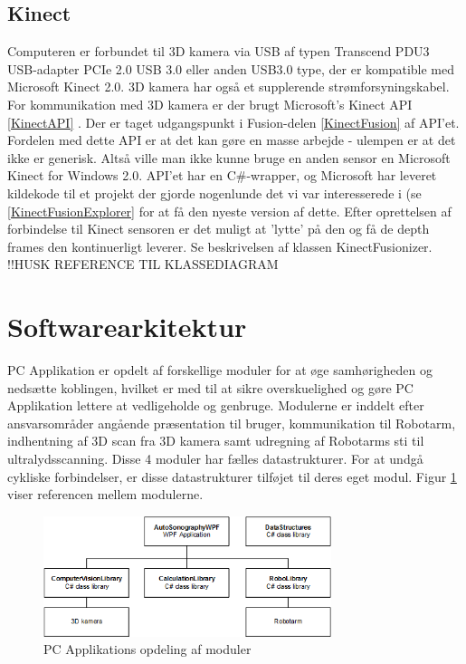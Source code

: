 \subsection{Kinect}
Computeren er forbundet til 3D kamera via USB af typen Transcend PDU3 USB-adapter PCIe 2.0 USB 3.0 eller anden USB3.0 type, der er kompatible med Microsoft Kinect 2.0. 3D kamera har også et supplerende strømforsyningskabel.
For kommunikation med 3D kamera er der brugt Microsoft's Kinect API \ref{KinectAPI} .
Der er taget udgangspunkt i Fusion-delen \ref{KinectFusion} af API'et. Fordelen med dette API er at det kan gøre en masse arbejde - ulempen er at det ikke er generisk. Altså ville man ikke kunne bruge en anden sensor en Microsoft Kinect for Windows 2.0. API'et har en C\#-wrapper, og Microsoft har leveret kildekode til et projekt der gjorde nogenlunde det vi var interesserede i (se \ref{KinectFusionExplorer} for at få den nyeste version af dette.
Efter oprettelsen af forbindelse til Kinect sensoren er det muligt at 'lytte' på den og få de depth frames den kontinuerligt leverer. Se beskrivelsen af klassen KinectFusionizer. !!HUSK REFERENCE TIL KLASSEDIAGRAM
 
\newpage

\section{Softwarearkitektur}
PC Applikation er opdelt af forskellige moduler for at øge samhørigheden og nedsætte koblingen, hvilket er med til at sikre overskuelighed og gøre PC Applikation lettere at vedligeholde og genbruge. Modulerne er inddelt efter ansvarsområder angående præsentation til bruger, kommunikation til Robotarm, indhentning af 3D scan fra 3D kamera samt udregning af Robotarms sti til ultralydsscanning. Disse 4 moduler har fælles datastrukturer. For at undgå cykliske forbindelser, er disse datastrukturer tilføjet til deres eget modul. Figur \ref{Layers} viser referencen mellem modulerne. 

\begin{figure}[H]
    \centering
    \includegraphics[width=0.75\textwidth]{figurer/d/Design/Layers}
    \caption{PC Applikations opdeling af moduler}
    \label{Layers}
\end{figure}


